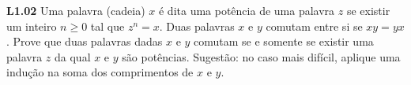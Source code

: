 
\noindent \textbf{L1.02} Uma palavra (cadeia) $x$ é dita uma potência de uma palavra $z$ se existir um inteiro $n \geq 0$ tal que $z^n = x$. Duas palavras $x$ e $y$ comutam entre si se $xy = yx$. Prove que duas palavras dadas $x$ e $y$ comutam se e somente se existir uma palavra $z$ da qual $x$ e $y$ são potências. Sugestão: no caso mais difícil, aplique uma indução na soma dos comprimentos de $x$ e $y$.
